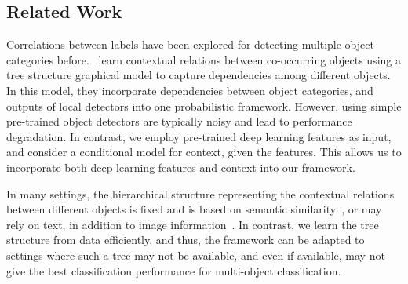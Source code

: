 \documentclass{article}
\begin{document}



 \subsection{Related Work}




Correlations between labels have been explored for detecting multiple object categories before.~\cite{myungjin,outofcontext} learn contextual relations between co-occurring objects using a tree structure graphical model   to capture dependencies among different objects. In this model, they incorporate  dependencies between object categories, and outputs of local detectors into one probabilistic framework.   However, using simple pre-trained object detectors   are typically noisy and lead to performance degradation. In contrast, we employ pre-trained deep learning features as input, and consider a conditional model for context, given the features. This allows us to incorporate both deep learning features and context into our framework.


In many settings, the hierarchical structure representing the contextual relations between different objects is fixed and is based on semantic similarity~\cite{grauman2011learning}, or may rely on text, in addition to image information~\cite{li2010building}. In contrast, we learn the tree structure from data efficiently, and thus, the framework can be adapted to settings where such a tree may not be available, and even if available, may not give the best classification performance for multi-object classification.
\end{document}
